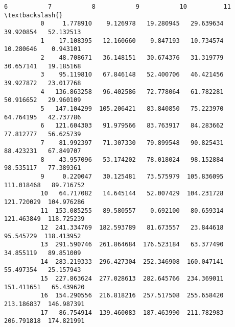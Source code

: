\documentclass[11pt]{article}
\begin{document}
\begin{Verbatim}[commandchars=\\\{\}]
                      6           7           8           9           10          11  \textbackslash{}
          0     1.778910    9.126978   19.280945   29.639634   39.920854   52.132513   
          1    17.108395   12.160660    9.847193   10.734574   10.280646    0.943101   
          2    48.708671   36.148151   30.674376   31.319779   30.657141   19.185168   
          3    95.119810   67.846148   52.400706   46.421456   39.927872   23.017768   
          4   136.863258   96.402586   72.778064   61.782281   50.916652   29.960109   
          5   147.104299  105.206421   83.840850   75.223970   64.764195   42.737786   
          6   121.604303   91.979566   83.763917   84.283662   77.812777   56.625739   
          7    81.992397   71.307330   79.899548   90.825431   88.423231   67.849707   
          8    43.957096   53.174202   78.018024   98.152884   98.535117   77.389361   
          9     0.220047   30.125481   73.575979  105.836095  111.018468   89.716752   
          10   64.717082   14.645144   52.007429  104.231728  121.720029  104.976286   
          11  153.085255   89.580557    0.692100   80.659314  121.463849  118.725239   
          12  241.334769  182.593789   81.673557   23.844618   95.545729  118.413952   
          13  291.590746  261.864684  176.523184   63.377490   34.855119   89.851009   
          14  283.219333  296.427304  252.346908  160.047141   55.497354   25.157943   
          15  227.863624  277.028613  282.645766  234.369011  151.411651   65.439620   
          16  154.290556  216.818216  257.517508  255.658420  213.186837  146.987391   
          17   86.754914  139.460083  187.463990  211.782983  206.791818  174.821991   
          

\end{Verbatim}
\end{document}
